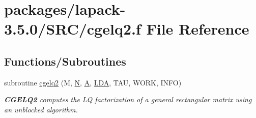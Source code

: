\hypertarget{cgelq2_8f}{}\section{packages/lapack-\/3.5.0/\+S\+R\+C/cgelq2.f File Reference}
\label{cgelq2_8f}
\subsection*{Functions/\+Subroutines}
\begin{DoxyCompactItemize}
\item 
subroutine \hyperlink{group__complexGEcomputational_gaf5aa309786b736467fe6b2353695883f}{cgelq2} (M, \hyperlink{polmisc_8c_a0240ac851181b84ac374872dc5434ee4}{N}, \hyperlink{classA}{A}, \hyperlink{example__user_8c_ae946da542ce0db94dced19b2ecefd1aa}{L\+D\+A}, T\+A\+U, W\+O\+R\+K, I\+N\+F\+O)
\begin{DoxyCompactList}\small\item\em {\bfseries C\+G\+E\+L\+Q2} computes the L\+Q factorization of a general rectangular matrix using an unblocked algorithm. \end{DoxyCompactList}\end{DoxyCompactItemize}
